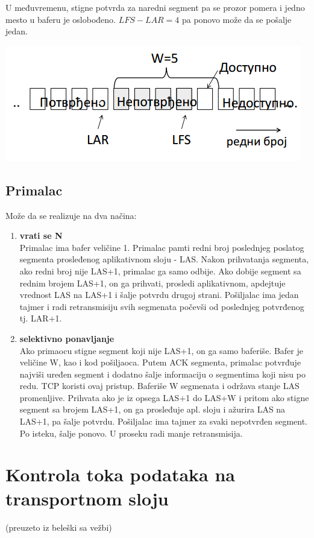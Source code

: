 \documentclass{article} %
\begin{document}
U međuvremenu, stigne potvrda za naredni segment pa se prozor pomera i jedno mesto u baferu je oslobođeno. $ LFS - LAR = 4 $ pa ponovo može da se pošalje jedan.
 \begin{center}
	\includegraphics[scale=0.5]{klizproz2}
\end{center}
\subsection{Primalac}
Može da se realizuje na dva načina:
\begin{enumerate}
 \item \textbf{vrati se N}\\
 Primalac ima bafer veličine 1. Primalac pamti redni broj poslednjeg poslatog segmenta prosleđenog aplikativnom sloju - LAS. Nakon prihvatanja segmenta, ako  redni broj nije LAS+1, primalac ga samo odbije. Ako dobije segment sa rednim brojem LAS+1, on ga prihvati, prosledi aplikativnom, apdejtuje vrednost LAS na LAS+1 i šalje potvrdu drugoj strani. Pošiljalac ima jedan tajmer i radi retransmisiju svih segmenata počevši od poslednjeg potvrđenog tj. LAR+1.
 \item \textbf{selektivno ponavljanje}\\
 Ako primaocu stigne segment koji nije LAS+1, on ga samo baferiše. Bafer je veličine W, kao i kod pošiljaoca. Putem ACK segmenta, primalac potvrđuje najviši uređen segment i dodatno šalje informaciju o segmentima koji nisu po redu. TCP koristi ovaj pristup. Baferiše W segmenata i održava stanje LAS promenljive. Prihvata ako je iz opsega LAS+1 do LAS+W i pritom ako stigne segment sa brojem LAS+1, on ga prosleđuje apl. sloju i ažurira LAS na LAS+1, pa šalje potvrdu. Pošiljalac ima tajmer za svaki nepotvrđen segment. Po isteku, šalje ponovo. U proseku radi manje retransmisija.
\end{enumerate}
 
\section{Kontrola toka podataka na transportnom sloju}
(preuzeto iz beleški sa vežbi)\\
\end{document}
